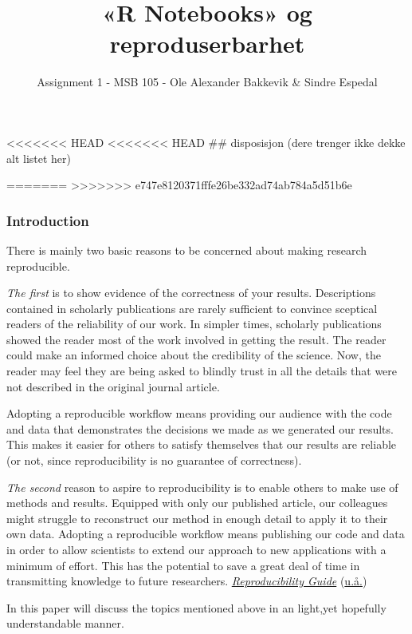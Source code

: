 \documentclass[
  12pt,
  norsk,
]{article}
\title{«R Notebooks» og reproduserbarhet}
\author{Assignment 1 - MSB 105 - Ole Alexander Bakkevik \& Sindre
Espedal}
\date{}
\begin{document}
\maketitle

<<<<<<< HEAD
\textless\textless\textless\textless\textless\textless\textless{} HEAD
\#\# disposisjon (dere trenger ikke dekke alt listet her)

=======
>>>>>>> e747e8120371fffe26be332ad74ab784a5d51b6e
\hypertarget{introduction}{%
\subsubsection{Introduction}\label{introduction}}

There is mainly two basic reasons to be concerned about making research
reproducible.

\emph{The first} is to show evidence of the correctness of your results.
Descriptions contained in scholarly publications are rarely sufficient
to convince sceptical readers of the reliability of our work. In simpler
times, scholarly publications showed the reader most of the work
involved in getting the result. The reader could make an informed choice
about the credibility of the science. Now, the reader may feel they are
being asked to blindly trust in all the details that were not described
in the original journal article.

Adopting a reproducible workflow means providing our audience with the
code and data that demonstrates the decisions we made as we generated
our results. This makes it easier for others to satisfy themselves that
our results are reliable (or not, since reproducibility is no guarantee
of correctness).

\emph{The second} reason to aspire to reproducibility is to enable
others to make use of methods and results. Equipped with only our
published article, our colleagues might struggle to reconstruct our
method in enough detail to apply it to their own data. Adopting a
reproducible workflow means publishing our code and data in order to
allow scientists to extend our approach to new applications with a
minimum of effort. This has the potential to save a great deal of time
in transmitting knowledge to future researchers.
\protect\hyperlink{ref-Git-reproducabilty}{\emph{Reproducibility Guide}}
(\protect\hyperlink{ref-Git-reproducabilty}{u.å.})

In this paper will discuss the topics mentioned above in an light,yet
hopefully understandable manner.
\end{document}
